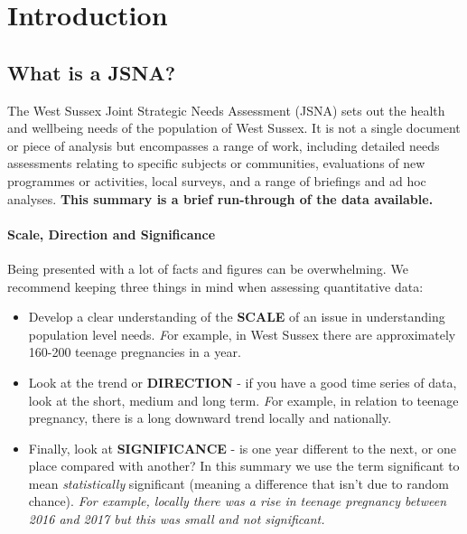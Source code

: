 \section{Introduction} %

\begin{tcolorbox}[width=\linewidth, colback={boxcolour}]
    \subsection{What is a JSNA?}
    The West Sussex Joint Strategic Needs Assessment (JSNA) sets out the health and wellbeing needs of the population of West Sussex. It is not a single document or piece of analysis but encompasses a range of work, including detailed needs assessments relating to specific subjects or communities, evaluations of new programmes or activities, local surveys, and a range of briefings and ad hoc analyses. {\bf This summary is a brief run-through of the data available.}
\end{tcolorbox}

\paragraph{Scale, Direction and Significance}
Being presented with a lot of facts and figures can be overwhelming. We recommend keeping three things in mind when assessing quantitative data:
\begin{itemize}
    \item Develop a clear understanding of the {\bfseries SCALE} of an issue in understanding population level needs. {\textit For example, in West Sussex there are approximately 160-200 teenage pregnancies in a year.}
    \item Look at the trend or {\bfseries DIRECTION} - if you have a good time series of data, look at the short, medium and long term. {\textit For example, in relation to teenage pregnancy, there is a long downward trend locally and nationally.}
    \item Finally, look at {\bfseries SIGNIFICANCE} - is one year different to the next, or one place compared with another? In this summary we use the term significant to mean \textit{statistically} significant (meaning a difference that isn't due to random chance). \textit{For example, locally there was a rise in teenage pregnancy between 2016 and 2017 but this was small and not significant.}
\end{itemize}

